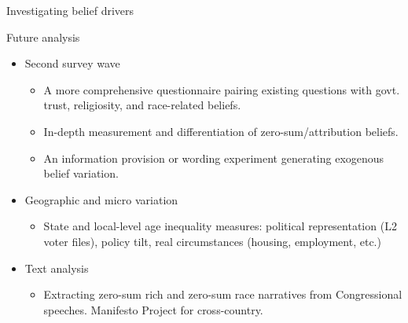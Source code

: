 \documentclass{beamer}
\begin{document}
\begin{frame}{Investigating belief drivers}

Future analysis
\begin{itemize}
    \item Second survey wave
    \begin{itemize}
        \item A more comprehensive questionnaire pairing existing questions with govt. trust, religiosity, and race-related beliefs.
        \item In-depth measurement and differentiation of zero-sum/attribution beliefs. %
        \item An information provision or wording experiment generating exogenous belief variation.
    \end{itemize}
    \item Geographic and micro variation
    \begin{itemize}
        \item State and local-level age inequality measures: political representation (L2 voter files), policy tilt, real circumstances (housing, employment, etc.)
    \end{itemize}
    \item Text analysis
    \begin{itemize}
        \item Extracting zero-sum rich and zero-sum race narratives from Congressional speeches. Manifesto Project for cross-country.
    \end{itemize}
\end{itemize}
    
\end{frame}
\end{document}
